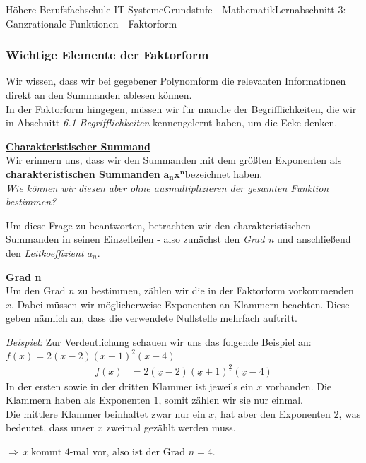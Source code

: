 \documentclass[11pt,twocolumn,oneside,openany,headings=optiontotoc,11pt,numbers=noenddot]{article}
\begin{document}
\begin{worksheet}{Höhere Berufsfachschule IT-Systeme}{Grundstufe - Mathematik}{Lernabschnitt 3: Ganzrationale Funktionen - Faktorform}
		\subsubsection{Wichtige Elemente der Faktorform}
		Wir wissen, dass wir bei gegebener Polynomform die relevanten Informationen direkt an den Summanden ablesen können.\\
		In der Faktorform hingegen, müssen wir für manche der Begrifflichkeiten, die wir in Abschnitt \textit{6.1 Begrifflichkeiten} kennengelernt haben, um die Ecke denken.\\
		\par\noindent
		\underline{\textbf{Charakteristischer Summand}}\\
		Wir erinnern uns, dass wir den Summanden mit dem größten Exponenten als \textbf{charakteristischen Summanden} \(\mathbf{a_nx^n}\)bezeichnet haben.\\
		\textit{Wie können wir diesen aber \underline{ohne ausmultiplizieren} der gesamten Funktion bestimmen?}\\
		\par\noindent
		Um diese Frage zu beantworten, betrachten wir den charakteristischen Summanden in seinen Einzelteilen - also zunächst den \textit{Grad n} und anschließend den \textit{Leitkoeffizient \(a_n\)}.\\
		\par\noindent
		\underline{\textbf{Grad n}}\\
		Um den Grad \(n\) zu bestimmen, zählen wir die in der Faktorform vorkommenden \(x\). Dabei müssen wir möglicherweise Exponenten an Klammern beachten. Diese geben nämlich an, dass die verwendete Nullstelle mehrfach auftritt.\\
		\par\noindent
		\textit{\underline{Beispiel:}} Zur Verdeutlichung schauen wir uns das folgende Beispiel an: \(f(x) = 2(x-2)(x+1)^2(x-4)\)
		\begin{align*}
			f(x) & = 2(\underline{x}-2)(\underline{x}+1)^{\underline{2}}(\underline{x}-4)	
		\end{align*}
		In der ersten sowie in der dritten Klammer ist jeweils ein \(x\) vorhanden. Die Klammern haben als Exponenten \(1\), somit zählen wir sie nur einmal.\\
		Die mittlere Klammer beinhaltet zwar nur ein \(x\), hat aber den Exponenten \(2\), was bedeutet, dass unser \(x\) zweimal gezählt werden muss.\\
		\par\noindent
		\(\Rightarrow\ x\ \text{kommt\ } 4\text{-mal\ vor,\ also\ ist\ der\ Grad}\) \colorbox{green!10}{\(n = 4\)}.\\

\end{worksheet}
\end{document}
